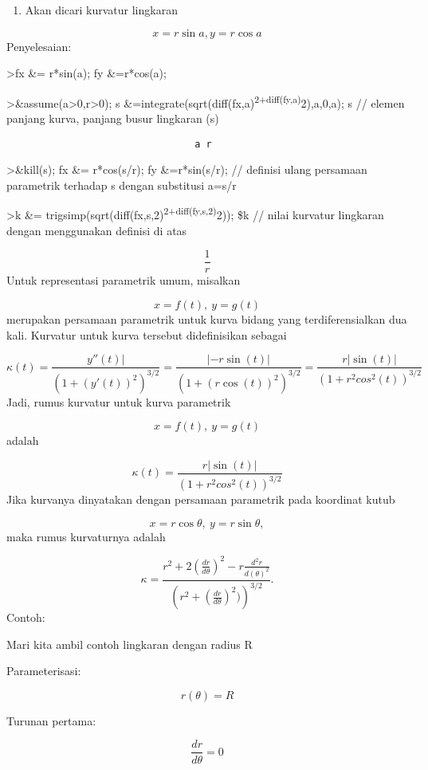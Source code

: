 \documentclass[
]{book}
\providecommand{\tightlist}{%
  \setlength{\itemsep}{0pt}\setlength{\parskip}{0pt}}
\begin{document}
\begin{enumerate}
\def\labelenumi{\arabic{enumi}.}
\setcounter{enumi}{1}
\tightlist
\item
  Akan dicari kurvatur lingkaran
\end{enumerate}

\[x=r\sin a, y=r\cos a\]Penyelesaian:

\textgreater fx \&= r*sin(a); fy \&=r*cos(a);

\textgreater\&assume(a\textgreater0,r\textgreater0); s \&=integrate(sqrt(diff(fx,a)\textsuperscript{2+diff(fy,a)}2),a,0,a); s // elemen panjang kurva, panjang busur lingkaran (s)

\begin{verbatim}
                                 a r
\end{verbatim}

\textgreater\&kill(s); fx \&= r*cos(s/r); fy \&=r*sin(s/r); // definisi ulang persamaan parametrik terhadap s dengan substitusi a=s/r

\textgreater k \&= trigsimp(sqrt(diff(fx,s,2)\textsuperscript{2+diff(fy,s,2)}2)); \$k // nilai kurvatur lingkaran dengan menggunakan definisi di atas

\[\frac{1}{r}\]Untuk representasi parametrik umum, misalkan

\[x = f(t),\ y= g(t)\]merupakan persamaan parametrik untuk kurva bidang yang terdiferensialkan dua kali. Kurvatur untuk kurva tersebut didefinisikan sebagai

\[\kappa(t)=\frac{y''(t)|}{\left(1+(y'(t))^2\right)^{3/2}}=\frac{|-r\sin(t)|}{\left(1+(r\cos(t))^2\right)^{3/2}}=\frac{r|\sin(t)|}{\left(1+r^2cos^2(t)\right)^{3/2}}\]Jadi, rumus kurvatur untuk kurva parametrik

\[x=f(t),\ y=g(t)\]adalah

\[\kappa(t) = \frac{r|\sin(t)|}{\left(1+r^2cos^2(t)\right)^{3/2}}\]Jika kurvanya dinyatakan dengan persamaan parametrik pada koordinat kutub

\[x=r\cos\theta,\ y=r\sin\theta,\]maka rumus kurvaturnya adalah

\[\kappa = \frac{r^2+2(\frac{dr}{d\theta})^2-r\frac{d^2r}{d(\theta)^2}}{\left(r^2+(\frac{dr}{d\theta})^2)\right)^{3/2}}.\]Contoh:

Mari kita ambil contoh lingkaran dengan radius R

Parameterisasi:

\[r(\theta)=R\]

Turunan pertama:

\[\frac{dr}{d\theta}=0\]
\end{document}
